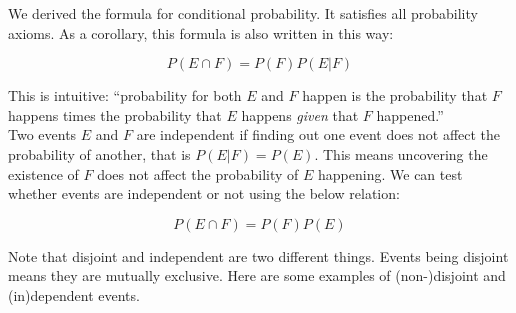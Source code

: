 \documentclass[12pt, a4paper]{article}
\newcounter{exa}
\begin{document}
We derived the formula for conditional probability. It satisfies all probability axioms. As a corollary, this formula is also written in this way:

$$P(E \cap F)=P(F)P(E|F)$$

This is intuitive: ``probability for both $E$ and $F$ happen is the probability that $F$ happens times the probability that $E$ happens \textit{given} that $F$ happened.'' \\

Two events $E$ and $F$ are independent if finding out one event does not affect the probability of another, that is $P(E|F)=P(E)$. This means uncovering the existence of $F$ does not affect the probability of $E$ happening. We can test whether events are independent or not using the below relation:

$$P(E \cap F)=P(F)P(E)$$

Note that disjoint and independent are two different things. Events being disjoint means they are mutually exclusive. Here are some examples of (non-)disjoint and (in)dependent events.
\end{document}
